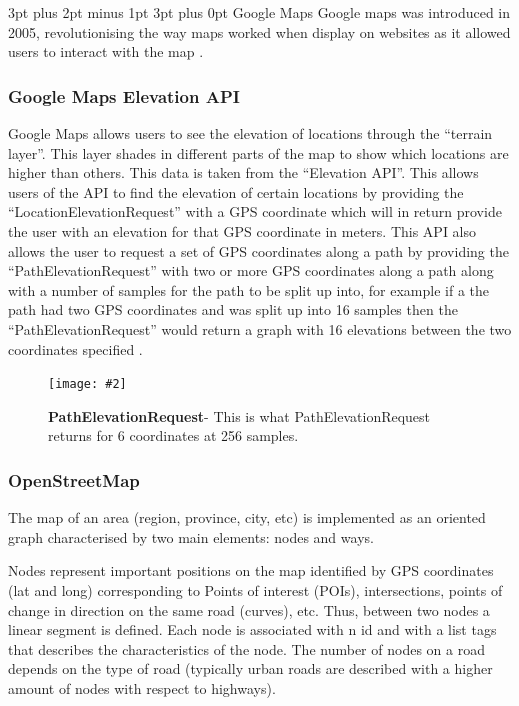 \documentclass[12pt,a4paper]{article}
\makeatletter
\newcommand{\figuremacro}[5]{
    \begin{figure}[#1]
        \centering
        \texttt{[image: \#2]}
        \caption[#3]{\textbf{#3}#4}
        \label{fig:#2}
    \end{figure}
}
\renewcommand\subsection{\@startsection {subsection}{1}{0mm} %
                               {3pt plus 2pt minus 1pt} %
                               {3pt plus 0pt} %
                               {\normalfont\bfseries}}
\makeatother
\begin{document}
\subsection{Google Maps}
Google maps was introduced in 2005, revolutionising the way maps worked when display on websites as it allowed users to interact with the map \cite{Svennerberg2010}.

\subsubsection{Google Maps Elevation API}
Google Maps allows users to see the elevation of locations through the ``terrain layer''. This layer shades in different parts of the map to show which locations are higher than others. This data is taken from the ``Elevation API''. This allows users of the API to find the elevation of certain locations by providing the ``LocationElevationRequest'' with a GPS coordinate which will in return provide the user with an elevation for that GPS coordinate in meters. This API also allows the user to request a set of GPS coordinates along a path by providing the ``PathElevationRequest'' with two or more GPS coordinates along a path along with a number of samples for the path to be split up into, for example if a the path had two GPS coordinates and was split up into 16 samples then the ``PathElevationRequest'' would return a graph with 16 elevations between the two coordinates specified \cite{googleElevation}.

\figuremacro{h}{googleElevationPath}{PathElevationRequest}{- This is what PathElevationRequest returns for 6 coordinates at 256 samples.}{0.75} 

\newpage

\subsubsection{OpenStreetMap}
The map of an area (region, province, city, etc) is implemented as an oriented graph characterised by two main elements: nodes and ways.

Nodes represent important positions on the map identified by GPS coordinates (lat and long) corresponding to Points of interest (POIs), intersections, points of change in direction on the same road (curves), etc. Thus, between two nodes a linear segment is defined. Each node is associated with n id and with a list tags that describes the characteristics of the node. The number of nodes on a road depends on the type of road (typically urban roads are described with a higher amount of nodes with respect to highways).
\end{document}
